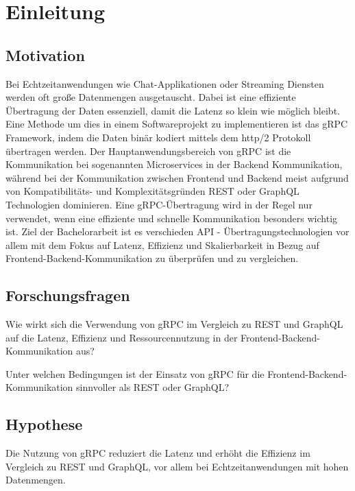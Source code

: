 \chapter{ Einleitung }
\label{chap:info_REMOVE_ME}
\chapterstart

\section{Motivation}
Bei Echtzeitanwendungen wie Chat-Applikationen oder Streaming Diensten werden
oft große Datenmengen ausgetauscht. Dabei ist eine effiziente Übertragung der Daten
essenziell, damit die Latenz so klein wie möglich bleibt. Eine Methode um dies in
einem Softwareprojekt zu implementieren ist das gRPC Framework, indem die Daten
binär kodiert mittels dem http/2 Protokoll übertragen werden.
Der Hauptanwendungsbereich von gRPC ist die Kommunikation bei sogenannten Microservices
in der Backend Kommunikation, während bei der Kommunikation zwischen
Frontend und Backend meist aufgrund von Kompatibilitäts- und Komplexitätsgründen
REST oder GraphQL Technologien dominieren. Eine gRPC-Übertragung
wird in der Regel nur verwendet, wenn eine effiziente und schnelle Kommunikation
besonders wichtig ist. Ziel der Bachelorarbeit ist es verschieden API - Übertragungstechnologien
vor allem mit dem Fokus auf Latenz, Effizienz und Skalierbarkeit in Bezug
auf Frontend-Backend-Kommunikation zu überprüfen und zu vergleichen.

\section{Forschungsfragen}
Wie wirkt sich die Verwendung von gRPC im Vergleich zu REST
und GraphQL auf die Latenz, Effizienz und Ressourcennutzung in der Frontend-Backend-
Kommunikation aus?

Unter welchen Bedingungen ist der Einsatz von gRPC für die
Frontend-Backend-Kommunikation sinnvoller als REST oder GraphQL?

\section{Hypothese}

Die Nutzung von gRPC reduziert die Latenz und erhöht die Effizienz im
Vergleich zu REST und GraphQL, vor allem bei Echtzeitanwendungen mit hohen Datenmengen.

